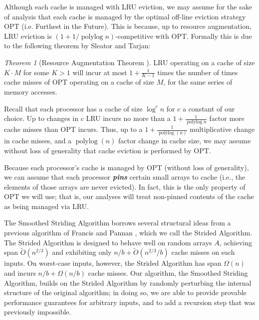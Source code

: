 \documentclass[twocolumn,10pt]{article}
\newcommand{\polylog}{\operatorname{polylog}}
\newcommand{\defn}[1]{{\textit{\textbf{\boldmath #1}}}\xspace}
\renewcommand{\paragraph}[1]{\vspace{0.09in}\noindent{\bf \boldmath #1.}}
\theoremstyle{remark}
\newtheorem{theorem}{Theorem}[section]
\theoremstyle{remark}
\begin{document}
Although each cache is managed with LRU eviction, we may assume
for the sake of analysis that each cache is managed by the optimal
off-line eviction strategy OPT (i.e. Furthest in the Future). This is
because, up to resource augmentation, LRU eviction is $(1 + 1/\polylog
n)$-competitive with OPT. Formally this is due to the following
theorem by Sleator and Tarjan:
\begin{theorem}[Resource Augmentation Theorem \cite{SleatorTa85}]
  LRU operating on a cache of size $K\cdot M$ for some $K>1$ will incur at most
  $1+\frac{1}{K-1}$ times the number of times cache misses of OPT operating on
  a cache of size $M$, for the same series of memory accesses.
  \label{thm:augmentation}
\end{theorem}

Recall that each processor has a cache of size $\log^c n$ for $c$ a
constant of our choice.  Up to changes in $c$ LRU incurs no more than
a $1+\frac{1}{\operatorname{polylog}{n}}$ factor more cache misses
than OPT incurs. Thus, up to a $1 + \frac{1}{\polylog(n)}$
multiplicative change in cache misses, and a $\polylog(n)$ factor change in
cache size, we may assume without loss of generality that cache
eviction is performed by OPT.

Because each processor's cache is managed by OPT (without loss of
generality), we can assume that each processor \defn{pins} certain
small arrays to cache (i.e., the elements of those arrays are never
evicted). In fact, this is the only property of OPT we will use; that
is, our analyses will treat non-pinned contents of the cache as being
managed via LRU.

\paragraph{The Strided Algorithm \cite{FrancisPa92}}
The Smoothed Striding Algorithm borrows several structural ideas from a previous algorithm of Francis and Pannan \cite{FrancisPa92}, which we call the Strided Algorithm. The Strided Algorithm is designed to behave well on random arrays $A$, achieving span $\tilde{O}(n^{2/3})$ and exhibiting only $n/b + \tilde{O}(n^{2/3} / b)$  cache misses on such inputs. On worst-case inputs, however, the Strided Algorithm has span $\Omega(n)$ and incurs $n/b + \Omega(n/b)$ cache misses. Our algorithm, the Smoothed Striding Algorithm, builds on the Strided Algorithm by randomly perturbing the internal structure of the original algorithm; in doing so, we are able to provide provable performance guarantees for arbitrary inputs, and to add a recursion step that was previously impossible.
\end{document}
